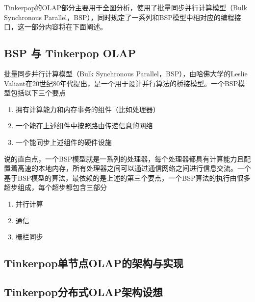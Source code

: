 \documentclass{article}
\begin{document}
Tinkerpop的OLAP部分主要用于全图分析，使用了批量同步并行计算模型（Bulk Synchronous Parallel，BSP），同时规定了一系列和BSP模型中相对应的编程接口，这一部分内容将在下面阐述。

\subsection{BSP 与 Tinkerpop OLAP}
批量同步并行计算模型（Bulk Synchronous Parallel，BSP），由哈佛大学的Leslie Valiant在20世纪80年代提出，是一个用于设计并行算法的桥接模型。一个BSP模型包括以下三个要点

\begin{enumerate}
\item 拥有计算能力和内存事务的组件（比如处理器）
\item 一个能在上述组件中按照路由传递信息的网络
\item 一个能同步上述组件的硬件设施
\end{enumerate}

说的直白点，一个BSP模型就是一系列的处理器，每个处理器都具有计算能力且配置着高速的本地内存，所有处理器之间可以通过通信网络之间进行信息交流。一个基于BSP模型的算法，最依赖的是上述的第三个要点，一个BSP算法的执行由很多超步组成，每个超步都包含三部分

\begin{enumerate}
\item 并行计算
\item 通信
\item 栅栏同步
\end{enumerate}

\subsection{Tinkerpop单节点OLAP的架构与实现}

\subsection{Tinkerpop分布式OLAP架构设想}
\end{document}
